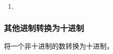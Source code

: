 \begin{enumerate}
                \item
            \end{enumerate}
        \subsubsection{其他进制转换为十进制}\label{subsubsec:ArithBasics/positional-notation-presentation-and-conversion/conversion/to-decimal}
            将一个非十进制的数转换为十进制，
